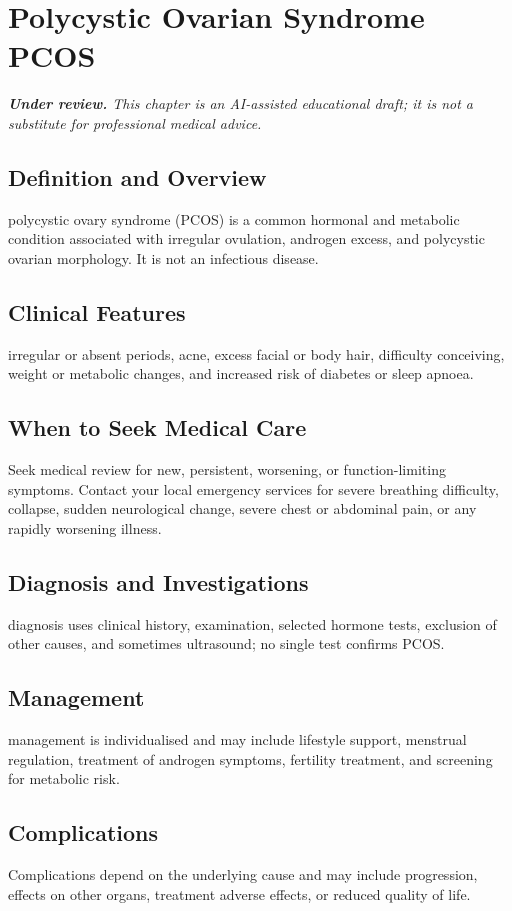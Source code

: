 \chapter{Polycystic Ovarian Syndrome PCOS}

\medskip
\noindent\textit{\textbf{Under review.} This chapter is an AI-assisted educational draft; it is not a substitute for professional medical advice.}

\section*{Definition and Overview}
polycystic ovary syndrome (PCOS) is a common hormonal and metabolic condition associated with irregular ovulation, androgen excess, and polycystic ovarian morphology. It is not an infectious disease.

\section*{Clinical Features}
irregular or absent periods, acne, excess facial or body hair, difficulty conceiving, weight or metabolic changes, and increased risk of diabetes or sleep apnoea.

\section*{When to Seek Medical Care}
Seek medical review for new, persistent, worsening, or function-limiting symptoms. Contact your local emergency services for severe breathing difficulty, collapse, sudden neurological change, severe chest or abdominal pain, or any rapidly worsening illness.

\section*{Diagnosis and Investigations}
diagnosis uses clinical history, examination, selected hormone tests, exclusion of other causes, and sometimes ultrasound; no single test confirms PCOS.

\section*{Management}
management is individualised and may include lifestyle support, menstrual regulation, treatment of androgen symptoms, fertility treatment, and screening for metabolic risk.

\section*{Complications}
Complications depend on the underlying cause and may include progression, effects on other organs, treatment adverse effects, or reduced quality of life.

